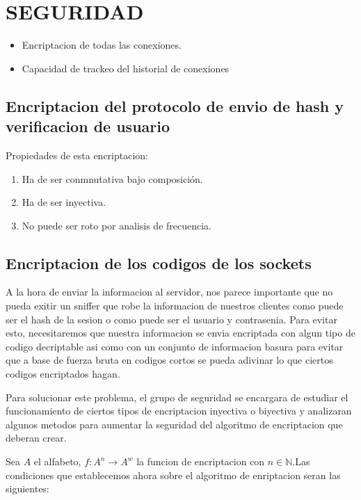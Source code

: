 \documentclass{article}
\theoremstyle{definition}
\begin{document}
\section{SEGURIDAD}

\begin{itemize}
    \item Encriptacion de todas las conexiones.
    \item Capacidad de trackeo del historial de conexiones
\end{itemize}

\subsection{Encriptacion del protocolo de envio de hash y verificacion de usuario}

Propiedades de esta encriptacion:
\begin{enumerate}
\item Ha de ser conmnutativa bajo composición.
\item Ha de ser inyectiva.
\item No puede ser roto por analisis de frecuencia.
\end{enumerate}

\subsection{Encriptacion de los codigos de los sockets}

A la hora de enviar la informacion al servidor, nos parece importante que no pueda exitir un sniffer que robe la informacion de nuestros clientes como puede ser el hash de la sesion o como puede ser el usuario y contrasenia. Para evitar esto, necesitaremos que nuestra informacion se envia encriptada con algun tipo de codigo decriptable asi como con un conjunto de informacion basura para evitar que a base de fuerza bruta en codigos cortos se pueda adivinar lo que ciertos codigos encriptados hagan.

Para solucionar este problema, el grupo de seguridad se encargara de estudiar el funcionamiento de ciertos tipos de encriptacion inyectiva o biyectiva y analizaran algunos metodos para aumentar la seguridad del algoritmo de encriptacion que deberan crear.

Sea $A$ el alfabeto, $f : A^n \to A^w$ la funcion de encriptacion con $n \in \mathbb{N}$.Las condiciones que establecemos ahora sobre el algoritmo de enriptacion seran las siguientes:
\end{document}
